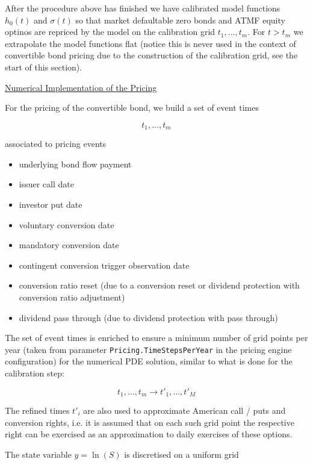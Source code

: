 {After the procedure above has finished we have calibrated model functions $h_0(t)$ and $\sigma(t)$ so that market
defaultable zero bonds and ATMF equity optinos are repriced by the model on the calibration grid $t_1,\ldots,t_m$. For
$t > t_m$ we extrapolate the model functions flat (notice this is never used in the context of convertible bond pricing
due to the construction of the calibration grid, see the start of this section).

\underline{Numerical Implementation of the Pricing}

For the pricing of the convertible bond, we build a set of event times

\begin{equation}
  t_1, \ldots, t_m
\end{equation}

associated to pricing events

\begin{itemize}
\item underlying bond flow payment
\item issuer call date
\item investor put date
\item voluntary conversion date
\item mandatory conversion date
\item contingent conversion trigger observation date
\item conversion ratio reset (due to a conversion reset or dividend protection with conversion ratio adjustment)
\item dividend pass through (due to dividend protection with pass through)
\end{itemize}

The set of event times is enriched to ensure a minimum number of grid points per year (taken from parameter
\verb+Pricing.TimeStepsPerYear+ in the pricing engine configuration) for the numerical PDE solution, similar to what is
done for the calibration step:

\begin{equation}
  t_1, \ldots, t_m \rightarrow t'_1, \ldots, t'_M
\end{equation}

The refined times $t'_i$ are also used to approximate American call / puts and conversion rights, i.e. it is assumed
that on each such grid point the respective right can be exercised as an approximation to daily exercises of these
options.

The state variable $y=\ln(S)$ is discretised on a uniform grid

}
